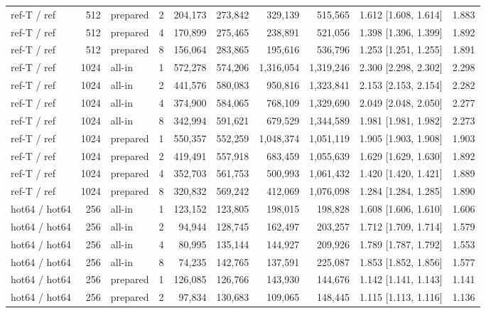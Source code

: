 \begin{table}[t]
{\begin{tabular}{lrlrrrrrlr}
ref-T / ref & 512 & prepared & 2 & 204{,}173 & 273{,}842 & 329{,}139 & 515{,}565 & 1.612 [1.608, 1.614] & 1.883 \\
ref-T / ref & 512 & prepared & 4 & 170{,}899 & 275{,}465 & 238{,}891 & 521{,}056 & 1.398 [1.396, 1.399] & 1.892 \\
ref-T / ref & 512 & prepared & 8 & 156{,}064 & 283{,}865 & 195{,}616 & 536{,}796 & 1.253 [1.251, 1.255] & 1.891 \\
ref-T / ref & 1024 & all-in & 1 & 572{,}278 & 574{,}206 & 1{,}316{,}054 & 1{,}319{,}246 & 2.300 [2.298, 2.302] & 2.298 \\
ref-T / ref & 1024 & all-in & 2 & 441{,}576 & 580{,}083 & 950{,}816 & 1{,}323{,}841 & 2.153 [2.153, 2.154] & 2.282 \\
ref-T / ref & 1024 & all-in & 4 & 374{,}900 & 584{,}065 & 768{,}109 & 1{,}329{,}690 & 2.049 [2.048, 2.050] & 2.277 \\
ref-T / ref & 1024 & all-in & 8 & 342{,}994 & 591{,}621 & 679{,}529 & 1{,}344{,}589 & 1.981 [1.981, 1.982] & 2.273 \\
ref-T / ref & 1024 & prepared & 1 & 550{,}357 & 552{,}259 & 1{,}048{,}374 & 1{,}051{,}119 & 1.905 [1.903, 1.908] & 1.903 \\
ref-T / ref & 1024 & prepared & 2 & 419{,}491 & 557{,}918 & 683{,}459 & 1{,}055{,}639 & 1.629 [1.629, 1.630] & 1.892 \\
ref-T / ref & 1024 & prepared & 4 & 352{,}703 & 561{,}753 & 500{,}993 & 1{,}061{,}432 & 1.420 [1.420, 1.421] & 1.889 \\
ref-T / ref & 1024 & prepared & 8 & 320{,}832 & 569{,}242 & 412{,}069 & 1{,}076{,}098 & 1.284 [1.284, 1.285] & 1.890 \\
hot64 / hot64 & 256 & all-in & 1 & 123{,}152 & 123{,}805 & 198{,}015 & 198{,}828 & 1.608 [1.606, 1.610] & 1.606 \\
hot64 / hot64 & 256 & all-in & 2 & 94{,}944 & 128{,}745 & 162{,}497 & 203{,}257 & 1.712 [1.709, 1.714] & 1.579 \\
hot64 / hot64 & 256 & all-in & 4 & 80{,}995 & 135{,}144 & 144{,}927 & 209{,}926 & 1.789 [1.787, 1.792] & 1.553 \\
hot64 / hot64 & 256 & all-in & 8 & 74{,}235 & 142{,}765 & 137{,}591 & 225{,}087 & 1.853 [1.852, 1.856] & 1.577 \\
hot64 / hot64 & 256 & prepared & 1 & 126{,}085 & 126{,}766 & 143{,}930 & 144{,}676 & 1.142 [1.141, 1.143] & 1.141 \\
hot64 / hot64 & 256 & prepared & 2 & 97{,}834 & 130{,}683 & 109{,}065 & 148{,}445 & 1.115 [1.113, 1.116] & 1.136 \\

\end{tabular}}
\end{table}
